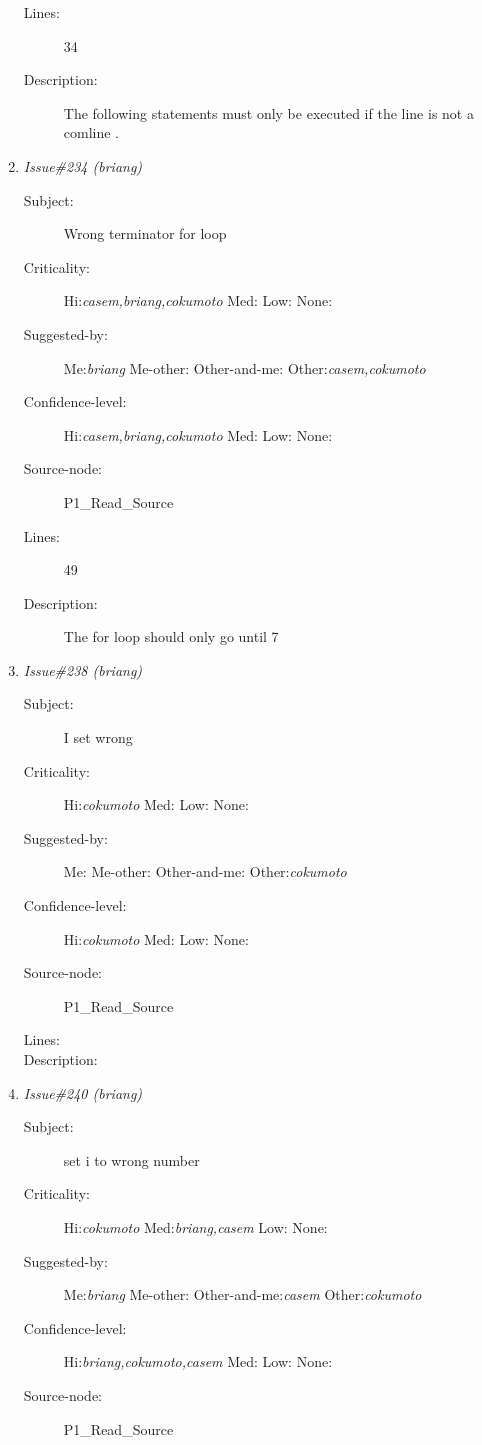 \begin{enumerate}
\begin{description}
\item [Lines:] 34

\item [Description:] The following statements must only be executed
if the line is not a comline .
\end{description}
\item {\it Issue\#234 (briang)}
\begin{description}
\item [Subject:] Wrong terminator for loop
\item [Criticality:] Hi:{\it casem,briang,cokumoto} Med:{\it } Low:{\it } None:{\it }
\item [Suggested-by:] Me:{\it briang} Me-other:{\it } Other-and-me:{\it } Other:{\it casem,cokumoto}
\item [Confidence-level:] Hi:{\it casem,briang,cokumoto} Med:{\it } Low:{\it } None:{\it }
\item [Source-node:] P1\_Read\_Source

\item [Lines:] 49

\item [Description:] The for loop should only go until 7
\end{description}
\item {\it Issue\#238 (briang)}
\begin{description}
\item [Subject:] I set wrong
\item [Criticality:] Hi:{\it cokumoto} Med:{\it } Low:{\it } None:{\it }
\item [Suggested-by:] Me:{\it } Me-other:{\it } Other-and-me:{\it } Other:{\it cokumoto}
\item [Confidence-level:] Hi:{\it cokumoto} Med:{\it } Low:{\it } None:{\it }
\item [Source-node:] P1\_Read\_Source

\item [Lines:] 

\item [Description:] 
\end{description}
\item {\it Issue\#240 (briang)}
\begin{description}
\item [Subject:] set i to wrong number
\item [Criticality:] Hi:{\it cokumoto} Med:{\it briang,casem} Low:{\it } None:{\it }
\item [Suggested-by:] Me:{\it briang} Me-other:{\it } Other-and-me:{\it casem} Other:{\it cokumoto}
\item [Confidence-level:] Hi:{\it briang,cokumoto,casem} Med:{\it } Low:{\it } None:{\it }
\item [Source-node:] P1\_Read\_Source


\end{description}
\end{enumerate}
